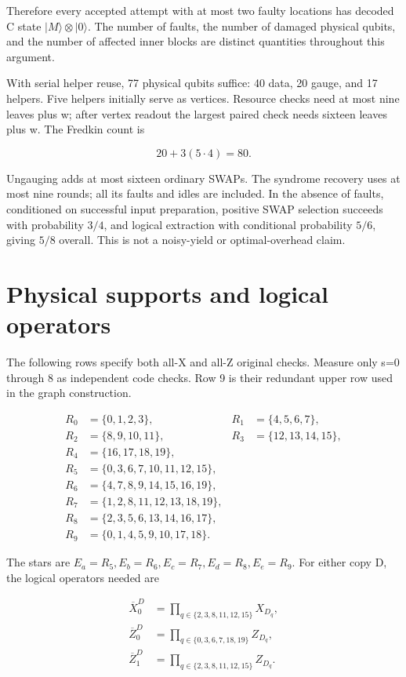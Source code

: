 \documentclass[11pt]{article}
\begin{document}
Therefore every accepted attempt with at most two faulty locations has decoded C state \(|M\rangle\otimes|0\rangle\). The number of faults, the number of damaged physical qubits, and the number of affected inner blocks are distinct quantities throughout this argument.

With serial helper reuse, 77 physical qubits suffice: 40 data, 20 gauge, and 17 helpers. Five helpers initially serve as vertices. Resource checks need at most nine leaves plus w; after vertex readout the largest paired check needs sixteen leaves plus w. The Fredkin count is

\[
20+3(5\cdot4)=80.
\]

Ungauging adds at most sixteen ordinary SWAPs. The syndrome recovery uses at most nine rounds; all its faults and idles are included. In the absence of faults, conditioned on successful input preparation, positive SWAP selection succeeds with probability \(3/4\), and logical extraction with conditional probability \(5/6\), giving \(5/8\) overall. This is not a noisy-yield or optimal-overhead claim.

\clearpage\appendix
{}\section{Physical supports and logical operators}
The following rows specify both all-X and all-Z original checks. Measure only s=0 through 8 as independent code checks. Row 9 is their redundant upper row used in the graph construction.

\[
\begin{aligned}
R_0&=\{0,1,2,3\},&R_1&=\{4,5,6,7\},\\
R_2&=\{8,9,10,11\},&R_3&=\{12,13,14,15\},\\
R_4&=\{16,17,18,19\},\\
R_5&=\{0,3,6,7,10,11,12,15\},\\
R_6&=\{4,7,8,9,14,15,16,19\},\\
R_7&=\{1,2,8,11,12,13,18,19\},\\
R_8&=\{2,3,5,6,13,14,16,17\},\\
R_9&=\{0,1,4,5,9,10,17,18\}.
\end{aligned}
\]

The stars are \(E_a=R_5,E_b=R_6,E_c=R_7,E_d=R_8,E_e=R_9\). For either copy D, the logical operators needed are

\[
\begin{aligned}
\overline X^D_0&=\prod_{q\in\{2,3,8,11,12,15\}}X_{D_q},\\
\overline Z^D_0&=\prod_{q\in\{0,3,6,7,18,19\}}Z_{D_q},\\
\overline Z^D_1&=\prod_{q\in\{2,3,8,11,12,15\}}Z_{D_q}.
\end{aligned}
\]
\end{document}
